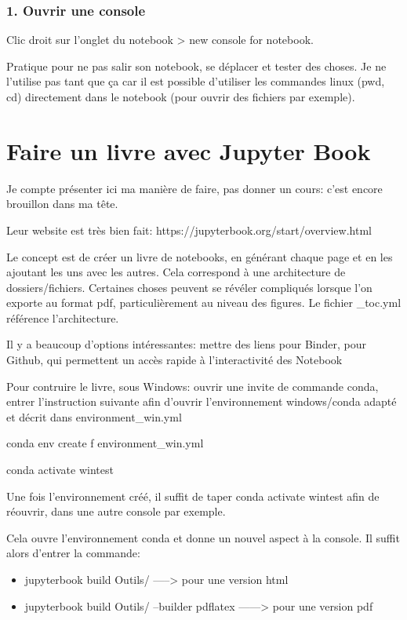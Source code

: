 \documentclass[letterpaper,10pt,english]{sphinxmanual}
\begin{document}
\subsection{1. Ouvrir une console}
\label{\detokenize{Part1/NoteBookTuto:ouvrir-une-console}}
Clic droit sur l’onglet du notebook > new console for notebook.

Pratique pour ne pas salir son notebook, se déplacer et tester des choses. Je ne l’utilise pas tant que ça car il est possible d’utiliser les commandes linux (pwd, cd) directement dans le notebook (pour ouvrir des fichiers par exemple).


\chapter{Faire un livre avec Jupyter Book}
\label{\detokenize{Part1/BookTuto:faire-un-livre-avec-jupyter-book}}\label{\detokenize{Part1/BookTuto::doc}}
Je compte présenter ici ma manière de faire, pas donner un cours: c’est encore brouillon dans ma tête.

Leur website est très bien fait: https://jupyterbook.org/start/overview.html

Le concept est de créer un livre de notebooks, en générant chaque page et en les ajoutant les uns avec les autres. Cela correspond à une architecture de dossiers/fichiers. Certaines choses peuvent se révéler compliqués lorsque l’on exporte au format pdf, particulièrement au niveau des figures. Le fichier \_toc.yml référence l’architecture.

Il y a beaucoup d’options intéressantes: mettre des liens pour Binder, pour Github, qui permettent un accès rapide à l’interactivité des Notebook

Pour contruire le livre, sous Windows:
ouvrir une invite de commande conda, entrer l’instruction suivante afin d’ouvrir l’environnement windows/conda adapté et décrit dans environment\_win.yml

conda env create \sphinxhyphen{}f environment\_win.yml

conda activate wintest

Une fois l’environnement créé, il suffit de taper conda activate wintest afin de réouvrir, dans une autre console par exemple.

Cela ouvre l’environnement conda et donne un nouvel aspect à la console. Il suffit alors d’entrer la commande:
\begin{itemize}
\item {} 
jupyter\sphinxhyphen{}book build Outils/          —–> pour une version html

\item {} 
jupyter\sphinxhyphen{}book build Outils/ –builder pdflatex         ——\sphinxhyphen{}> pour une version pdf

\end{itemize}
\end{document}
